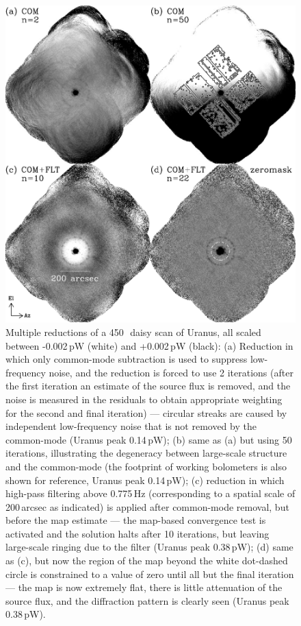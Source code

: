 \documentclass[useAMS,usenatbib,nofootinbib]{mn2e}
\begin{document}
\begin{figure}
\centering
\includegraphics[width=\linewidth]{pointmaps.pdf}
\caption{Multiple reductions of a 450\,\micron\ daisy scan of Uranus,
  all scaled between -0.002\,pW (white) and +0.002\,pW (black): (a)
  Reduction in which only common-mode subtraction is used to suppress
  low-frequency noise, and the reduction is forced to use 2 iterations
  (after the first iteration an estimate of the source flux is
  removed, and the noise is measured in the residuals to obtain
  appropriate weighting for the second and final iteration) ---
  circular streaks are caused by independent low-frequency noise that
  is not removed by the common-mode (Uranus peak 0.14\,pW); (b) same
  as (a) but using 50 iterations, illustrating the degeneracy between
  large-scale structure and the common-mode (the footprint of working
  bolometers is also shown for reference, Uranus peak 0.14\,pW); (c)
  reduction in which high-pass filtering above 0.775\,Hz
  (corresponding to a spatial scale of 200\,arcsec as indicated) is
  applied after common-mode removal, but before the map estimate ---
  the map-based convergence test is activated and the solution halts
  after 10 iterations, but leaving large-scale ringing due to the
  filter (Uranus peak 0.38\,pW); (d) same as (c), but now the region
  of the map beyond the white dot-dashed circle is constrained to a
  value of zero until all but the final iteration --- the map is now
  extremely flat, there is little attenuation of the source flux, and
  the diffraction pattern is clearly seen (Uranus peak 0.38\,pW).}
\label{fig:pointmaps}
\end{figure}
\end{document}
